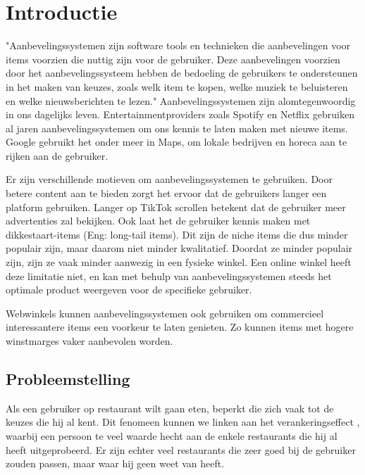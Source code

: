 \chapter{Introductie}

"Aanbevelingssystemen zijn software tools en technieken die aanbevelingen voor items voorzien die nuttig zijn voor de gebruiker. Deze aanbevelingen voorzien door het aanbevelingssysteem hebben de bedoeling de gebruikers te ondersteunen in het maken van keuzes, zoals welk item te kopen, welke muziek te beluisteren en welke nieuwsberichten te lezen." \cite{recsys_handbook}
Aanbevelingssystemen zijn alomtegenwoordig in ons dagelijks leven. Entertainmentproviders zoals Spotify en Netflix gebruiken al jaren aanbevelingssystemen om ons kennis te laten maken met nieuwe items. Google gebruikt het onder meer in Maps, om lokale bedrijven en horeca aan te rijken aan de gebruiker.


Er zijn verschillende motieven om aanbevelingssystemen te gebruiken.
Door betere content aan te bieden zorgt het ervoor dat de gebruikers langer een platform gebruiken. Langer op TikTok scrollen betekent dat de gebruiker meer advertenties zal bekijken. \cite{tiktokalgorithm}
Ook laat het de gebruiker kennis maken met dikkestaart-items (Eng: long-tail items). Dit zijn de niche items die dus minder populair zijn, maar daarom niet minder kwalitatief. Doordat ze minder populair zijn, zijn ze vaak minder aanwezig in een fysieke winkel. Een online winkel heeft deze limitatie niet, en kan met behulp van aanbevelingssystemen steeds het optimale product weergeven voor de specifieke gebruiker. \cite{cursus_hs2} 

Webwinkels kunnen aanbevelingssystemen ook gebruiken om commercieel interessantere items een voorkeur te laten genieten. Zo kunnen items met hogere winstmarges vaker aanbevolen worden.


\section{Probleemstelling}
Als een gebruiker op restaurant wilt gaan eten, beperkt die zich vaak tot de keuzes die hij al kent. Dit fenomeen kunnen we linken aan het verankeringseffect \cite{anchoring_effect}, waarbij een persoon te veel waarde hecht aan de enkele restaurants die hij al heeft uitgeprobeerd. Er zijn echter veel restaurants die zeer goed bij de gebruiker zouden passen, maar waar hij geen weet van heeft.

